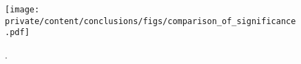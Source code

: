 


\begin{figure}
  \centering
  \texttt{[image: private/content/conclusions/figs/comparison\_of\_significance.pdf]}
  \caption{. \cite{Moedden:2015}}
  \label{fig:conclusion:upgrade:significance}
\end{figure}
